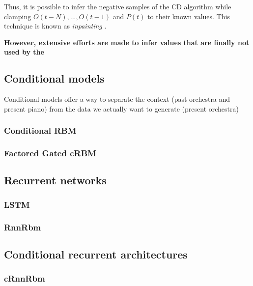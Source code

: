 \documentclass{article}
\begin{document}
Thus, it is possible to infer the negative samples of the CD algorithm while clamping $O(t-N), ..., O(t-1)$ and $P(t)$ to their known values. This technique is known as \textit{inpainting} \cite{Fischer2012}.

\textbf{However,  extensive efforts are made to infer values that are finally not used by the }

\subsection{Conditional models}
Conditional models offer a way to separate the context (past orchestra and present piano) from the data we actually want to generate (present orchestra)
\subsubsection{Conditional RBM}
\subsubsection{Factored Gated cRBM}

\subsection{Recurrent networks}
\subsubsection{LSTM}
\subsubsection{RnnRbm}

\subsection{Conditional recurrent architectures}
\subsubsection{cRnnRbm}
\end{document}
